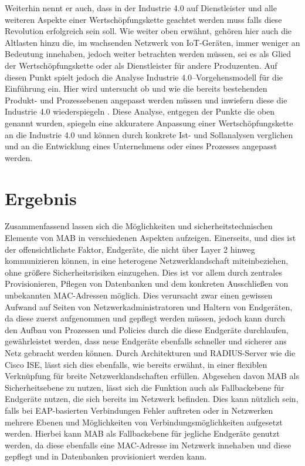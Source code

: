 \documentclass[conference]{IEEEtran}
\begin{document}
Weiterhin nennt er auch, dass in der Industrie 4.0 auf Dienstleister und alle weiteren Aspekte einer Wertschöpfungskette geachtet werden muss falls diese Revolution erfolgreich sein soll. Wie weiter oben erwähnt, gehören hier auch die Altlasten hinzu die, im wachsenden Netzwerk von IoT-Geräten, immer weniger an Bedeutung innehaben, jedoch weiter betrachten werden müssen, sei es als Glied der Wertschöpfungskette oder als Dienstleister für andere Produzenten. Auf diesen Punkt spielt jedoch die Analyse Industrie 4.0–Vorgehensmodell für die Einführung ein. Hier wird untersucht ob und wie die bereits bestehenden Produkt- und Prozessebenen angepasst werden müssen und inwiefern diese die Industrie 4.0 wiederspiegeln \cite{lucia2016industrie}. Diese Analyse, entgegen der Punkte die oben genannt wurden, spiegeln eine akkuratere Anpassung einer Wertschöpfungskette an die Industrie 4.0 und können durch konkrete Ist- und Sollanalysen verglichen und an die Entwicklung eines Unternehmens oder eines Prozesses angepasst werden.\\

%

\vspace{1em}
\section{Ergebnis}
Zusammenfassend lassen sich die Möglichkeiten und sicherheitstechnischen Elemente von MAB in verschiedenen Aspekten aufzeigen. Einerseits, und dies ist der offensichtlichste Faktor, Endgeräte, die nicht über Layer 2 hinweg kommunizieren können, in eine heterogene Netzwerklandschaft miteinbeziehen, ohne größere Sicherheitsrisiken einzugehen. Dies ist vor allem durch zentrales Provisionieren, Pflegen von Datenbanken und dem konkreten Ausschließen von unbekannten MAC-Adressen möglich. Dies verursacht zwar einen gewissen Aufwand auf Seiten von Netzwerkadministratoren und Haltern von Endgeräten, da diese zuerst aufgenommen und gepflegt werden müssen, jedoch kann durch den Aufbau von Prozessen und Policies durch die diese Endgeräte durchlaufen, gewährleistet werden, dass neue Endgeräte ebenfalls schneller und sicherer ans Netz gebracht werden können. Durch Architekturen und RADIUS-Server wie die Cisco ISE, lässt sich dies ebenfalls, wie bereits erwähnt, in einer flexiblen Verknüpfung für breite Netzwerklandschaften erfüllen. Abgesehen davon MAB als Sicherheitsebene zu nutzen, lässt sich die Funktion auch als Fallbackebene für Endgeräte nutzen, die sich bereits im Netzwerk befinden. Dies kann nützlich sein, falls bei EAP-basierten Verbindungen Fehler auftreten oder in Netzwerken mehrere Ebenen und Möglichkeiten von Verbindungsmöglichkeiten aufgesetzt werden. Hierbei kann MAB als Fallbackebene für jegliche Endgeräte genutzt werden, da diese ebenfalls eine MAC-Adresse im Netzwerk innehaben und diese gepflegt und in Datenbanken provisioniert werden kann.\\
\end{document}
